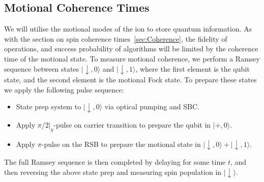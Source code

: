\subsection{Motional Coherence Times}
    We will utilise the motional modes of the ion to store quantum information.
    As with the section on spin coherence times~\ref{sec:Coherence}, the
    fidelity of operations, and success probability of algorithms will be
    limited by the coherence time of the motional state.  To measure motional
    coherence, we perform a Ramsey sequence between states $|\downarrow, 0
    \rangle$ and $|\downarrow, 1 \rangle$, where the first element is the qubit
    state, and the second element is the motional Fock state. To prepare these
    states we apply the following pulse sequence:
    \begin{itemize}
    \item State prep system to $|\downarrow, 0\rangle$ via optical pumping and SBC.
    \item Apply $\pi/2|_y$-pulse on carrier transition to prepare the qubit in $|+, 0\rangle$.
    \item Apply $\pi$-pulse on the RSB to prepare the motional state in $|\downarrow, 0\rangle + |\downarrow, 1\rangle$.
    \end{itemize}
    The full Ramsey sequence is then completed by delaying for some time $t$,
    and then reversing the above state prep and measuring spin population in
    $|\downarrow\rangle$. \\
    
